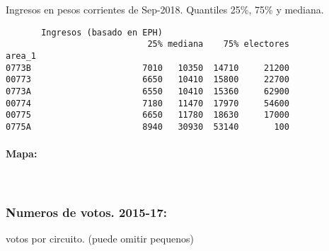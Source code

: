 \documentclass[11pt]{article}
\begin{document}
    
    Ingresos en pesos corrientes de Sep-2018. Quantiles 25\%, 75\% y
mediana.

    
    
    \begin{verbatim}
       Ingresos (basado en EPH)                         
                            25% mediana    75% electores
area_1                                                  
0773B                      7010   10350  14710     21200
00773                      6650   10410  15800     22700
0773A                      6550   10410  15360     62900
00774                      7180   11470  17970     54600
00775                      6650   11780  18630     17000
0775A                      8940   30930  53140       100
    \end{verbatim}

    
    \hypertarget{mapa}{%
\paragraph{Mapa:}\label{mapa}}

    
    \begin{center}
    \end{center}
    { \hspace*{\fill} \\}
    
    \hypertarget{numeros-de-votos.-2015-17}{%
\subsubsection{Numeros de votos.
2015-17:}\label{numeros-de-votos.-2015-17}}

    
    votos por circuito. (puede omitir pequenos)

    
    
\end{document}
